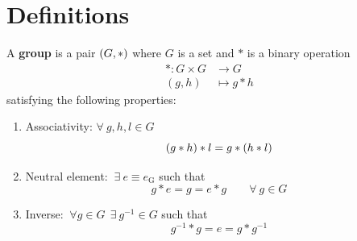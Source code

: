 \documentclass[../main.tex]{subfiles}
\begin{document}
\section{Definitions}
\begin{definition}
A \textbf{group} is a pair \(\pqty{G,\ast}\) where $G$ is a set and $\ast$ is a binary operation
\[
\begin{split}
\ast : G\times G& \to  G\\
(g,h) &\mapsto g\ast h
\end{split}
\]
satisfying the following properties: \renewcommand{\labelenumi}{(G\arabic{enumi})}
\begin{enumerate}
    \item Associativity: \( \forall \ g,h,l \in G\)
    \[
    \pqty{g\ast h}\ast l = g\ast \pqty{h\ast l}
    \]
    \item Neutral element: \(\ \exists \ e \equiv e_\textrm{G}\) such that
    \[
    g\ast e = g = e \ast g \qquad \forall\ g\in G
    \]
    \item Inverse: \( \ \forall g\in G \ \ \exists \ g^{-1}\in G\) such that
    \[
    g^{-1}\ast g=e=g\ast g^{-1}
    \]
\end{enumerate}
\end{definition}
\end{document}
